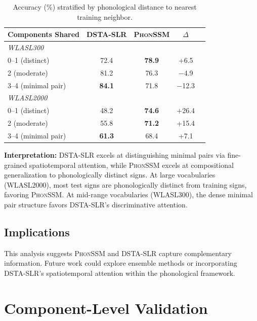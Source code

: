 \documentclass{article}
\newcommand{\phonssm}{\textsc{PhonSSM}}
\begin{document}
\begin{table}[ht]
\caption{Accuracy (\%) stratified by phonological distance to nearest training neighbor.}
\label{tab:method_by_distance}
\vspace{-1mm}
\begin{center}
\begin{small}
\begin{tabular*}{\columnwidth}{@{\extracolsep{\fill}}lcccc@{}}
\toprule
Components Shared & DSTA-SLR & \phonssm{} & $\Delta$ \\
\midrule
\multicolumn{4}{l}{\textit{WLASL300}} \\
0--1 (distinct) & 72.4 & \textbf{78.9} & +6.5 \\
2 (moderate) & 81.2 & 76.3 & $-$4.9 \\
3--4 (minimal pair) & \textbf{84.1} & 71.8 & $-$12.3 \\
\midrule
\multicolumn{4}{l}{\textit{WLASL2000}} \\
0--1 (distinct) & 48.2 & \textbf{74.6} & +26.4 \\
2 (moderate) & 55.8 & \textbf{71.2} & +15.4 \\
3--4 (minimal pair) & \textbf{61.3} & 68.4 & +7.1 \\
\bottomrule
\end{tabular*}
\end{small}
\end{center}
\vspace{-2mm}
\end{table}

\textbf{Interpretation:} DSTA-SLR excels at distinguishing minimal pairs via fine-grained spatiotemporal attention, while \phonssm{} excels at compositional generalization to phonologically distinct signs. At large vocabularies (WLASL2000), most test signs are phonologically distinct from training signs, favoring \phonssm{}. At mid-range vocabularies (WLASL300), the dense minimal pair structure favors DSTA-SLR's discriminative attention.

\subsection{Implications}

This analysis suggests \phonssm{} and DSTA-SLR capture complementary information. Future work could explore ensemble methods or incorporating DSTA-SLR's spatiotemporal attention within the phonological framework.

\section{Component-Level Validation}
\label{app:component_validation}
\end{document}
